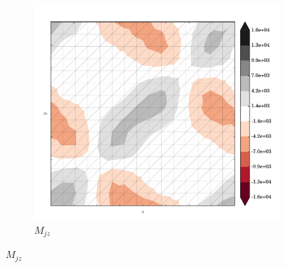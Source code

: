 \begin{figure}
  \begin{subfigure}[b]{0.3\linewidth}
    \includegraphics[width=\linewidth]{images/stress_balance/BP/M_jz.pdf}
  \caption{$M_{jz}$}
  \label{bp_M_jz}
  \end{subfigure}


\end{figure}
